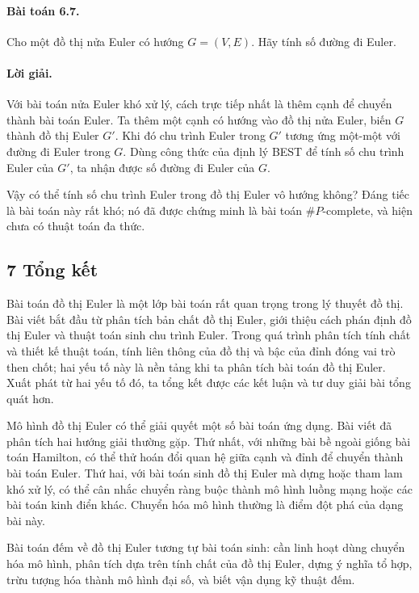 \documentclass[11pt]{article}
\begin{document}
\paragraph{Bài toán 6.7.}
Cho một đồ thị nửa Euler có hướng \(G=(V,E)\). Hãy tính số đường đi Euler.

\paragraph{Lời giải.}
Với bài toán nửa Euler khó xử lý, cách trực tiếp nhất là thêm cạnh để chuyển
thành bài toán Euler. Ta thêm một cạnh có hướng vào đồ thị nửa Euler, biến
\(G\) thành đồ thị Euler \(G'\). Khi đó chu trình Euler trong \(G'\) tương ứng
một-một với đường đi Euler trong \(G\). Dùng công thức của định lý BEST để tính
số chu trình Euler của \(G'\), ta nhận được số đường đi Euler của \(G\).

Vậy có thể tính số chu trình Euler trong đồ thị Euler vô hướng không? Đáng tiếc
là bài toán này rất khó; nó đã được chứng minh là bài toán \(\#P\)-complete, và
hiện chưa có thuật toán đa thức.

\subsection*{7 Tổng kết}

Bài toán đồ thị Euler là một lớp bài toán rất quan trọng trong lý thuyết đồ
thị. Bài viết bắt đầu từ phân tích bản chất đồ thị Euler, giới thiệu cách phán
định đồ thị Euler và thuật toán sinh chu trình Euler. Trong quá trình phân tích
tính chất và thiết kế thuật toán, tính liên thông của đồ thị và bậc của đỉnh
đóng vai trò then chốt; hai yếu tố này là nền tảng khi ta phân tích bài toán đồ
thị Euler. Xuất phát từ hai yếu tố đó, ta tổng kết được các kết luận và tư duy
giải bài tổng quát hơn.

Mô hình đồ thị Euler có thể giải quyết một số bài toán ứng dụng. Bài viết đã
phân tích hai hướng giải thường gặp. Thứ nhất, với những bài bề ngoài giống bài
toán Hamilton, có thể thử hoán đổi quan hệ giữa cạnh và đỉnh để chuyển thành
bài toán Euler. Thứ hai, với bài toán sinh đồ thị Euler mà dựng hoặc tham lam
khó xử lý, có thể cân nhắc chuyển ràng buộc thành mô hình luồng mạng hoặc các
bài toán kinh điển khác. Chuyển hóa mô hình thường là điểm đột phá của dạng bài
này.

Bài toán đếm về đồ thị Euler tương tự bài toán sinh: cần linh hoạt dùng chuyển
hóa mô hình, phân tích dựa trên tính chất của đồ thị Euler, dựng ý nghĩa tổ
hợp, trừu tượng hóa thành mô hình đại số, và biết vận dụng kỹ thuật đếm.
\end{document}
